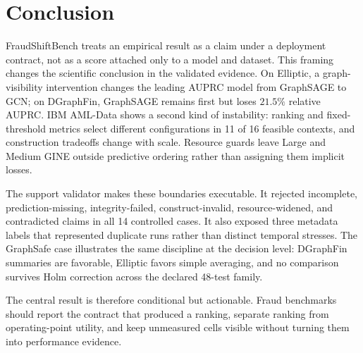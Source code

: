 \section{Conclusion}

FraudShiftBench treats an empirical result as a claim under a deployment contract, not as a score attached only to a model and dataset. This framing changes the scientific conclusion in the validated evidence. On Elliptic, a graph-visibility intervention changes the leading AUPRC model from GraphSAGE to GCN; on DGraphFin, GraphSAGE remains first but loses $21.5\%$ relative AUPRC. IBM AML-Data shows a second kind of instability: ranking and fixed-threshold metrics select different configurations in 11 of 16 feasible contexts, and construction tradeoffs change with scale. Resource guards leave Large and Medium GINE outside predictive ordering rather than assigning them implicit losses.

The support validator makes these boundaries executable. It rejected incomplete, prediction-missing, integrity-failed, construct-invalid, resource-widened, and contradicted claims in all 14 controlled cases. It also exposed three metadata labels that represented duplicate runs rather than distinct temporal stresses. The GraphSafe case illustrates the same discipline at the decision level: DGraphFin summaries are favorable, Elliptic favors simple averaging, and no comparison survives Holm correction across the declared 48-test family.

The central result is therefore conditional but actionable. Fraud benchmarks should report the contract that produced a ranking, separate ranking from operating-point utility, and keep unmeasured cells visible without turning them into performance evidence.
